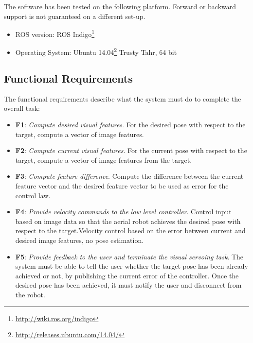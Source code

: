 The software  has been tested on the following platform. Forward or backward support is not guaranteed on a different set-up.

\begin{itemize}
	\item ROS version: ROS Indigo\footnote{\url{http://wiki.ros.org/indigo}}
	\item Operating System: Ubuntu 14.04\footnote{\url{http://releases.ubuntu.com/14.04/}} Trusty Tahr, 64 bit
\end{itemize}

\subsection{Functional Requirements}
\label{sec:functional-requirements}

The functional requirements describe what the system must do to complete the overall task:

\begin{itemize}
	\item \textbf{F1}: \emph{Compute desired visual features}. For the desired pose with respect to the target, compute a vector of image features. 
	
	\item \textbf{F2}: \emph{Compute current visual features}. For the current pose with respect to the target, compute a vector of image features from the target. 
	
	\item \textbf{F3}: \emph{Compute feature difference}. Compute the difference between the current feature vector and the desired feature vector to be used as error for the control law.		
	
	\item \textbf{F4}: \emph{Provide velocity commands to the low level controller}. Control input based on image data so that the aerial robot achieves the desired pose with respect to the target.Velocity control based on the error between current and desired image features, no pose estimation.
	
	\item \textbf{F5}: \emph{Provide feedback to the user and terminate the visual servoing task}. The system must be able to tell the user whether the target pose has been already achieved or not, by publishing the current error of the controller. Once the desired pose has been achieved, it must notify the user and disconnect from the robot.
\end{itemize}

